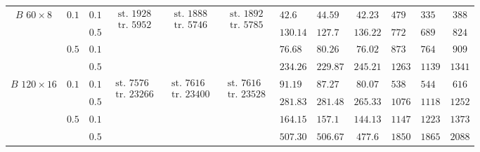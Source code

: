 \begin{table}[tp]
{\begin{tabular}{|c|c|c|c|c|c|g|h|c|g|h|c|}
       &  & $0.1$ &  &   &   & $42.6$ & $44.59$ & $42.23$ & $479$ & $335$ & $388$ \\ \hhline{|~|~|-|~|~|~|-|-|-|-|-|-|}
       & & $0.5$ & & & & $130.14$ & $127.7$ & $136.22$ & $772$ & $689$ & $824$ \\ \hhline{|~|-|-|~|~|~|-|-|-|-|-|-|}
       &  & $0.1$ & & & & $76.68$ & $80.26$ & $76.02$ & $873$ & $764$ & $909$ \\ \hhline{|~|~|-|~|~|~|-|-|-|-|-|-|}
       & & $0.5$ & & & & $234.26$ & $229.87$ & $245.21$ & $1263$ & $1139$ & $1341$ \\ \hline

       &  & $0.1$ &  &   &   & $91.19$ & $87.27$ & $80.07$ & $538$ & $544$ & $616$ \\ \hhline{|~|~|-|~|~|~|-|-|-|-|-|-|}
       & & $0.5$ & & & & $281.83$ & $281.48$ & $265.33$ & $1076$ & $1118$ & $1252$\\ \hhline{|~|-|-|~|~|~|-|-|-|-|-|-|}
       &  & $0.1$ & & & & $164.15$ & $157.1$ & $144.13$ & $1147$ & $1223$ & $1373$ \\ \hhline{|~|~|-|~|~|~|-|-|-|-|-|-|}
       & & $0.5$ & & & & $507.30$ & $506.67$ & $477.6$ & $1850$ & $1865$ & $2088$ \\ \hline


\end{tabular}}
\end{table}
